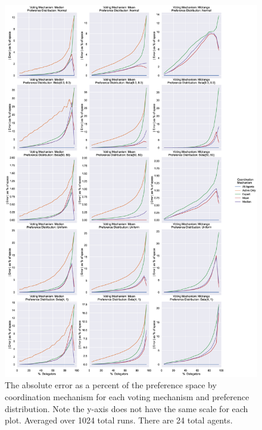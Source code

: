 %
%


\makeappendices

\renewcommand\thefigure{A.\arabic{figure}}

\begin{figure}[p]
    \centering
    \includegraphics[scale=0.35]
    {content/chapter2/figures/distribution_different_scale_error_as_percent_of_space_abs_mean}
    \caption{
        The absolute error as a percent of the preference space by coordination
        mechanism for each voting mechanism and preference distribution.
        Note the y-axis does not have the same scale for each plot.
        Averaged over 1024 total runs.
        There are 24 total agents.
    }
    \label{fig:distribution-different-scale-error-as-percent-of-space-abs-mean}
\end{figure}

